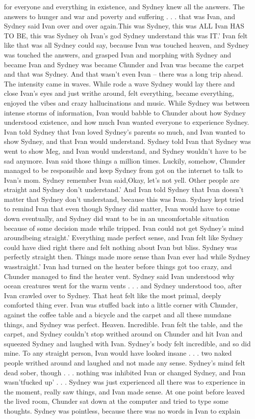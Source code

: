 \documentclass[12pt]{book}
\begin{document}
for everyone and everything in existence, and Sydney knew all the answers. The answers to hunger and war and poverty and suffering . . .  that was Ivan, and Sydney said Ivan over and over again.This was Sydney, this was ALL Ivan HAS TO BE, this was Sydney oh Ivan's god Sydney understand this was IT.' Ivan felt like that was all Sydney could say, because Ivan was touched heaven, and Sydney was touched the answers, and grasped Ivan and morphing with Sydney and became Ivan and Sydney was became Chunder and Ivan was became the carpet and that was Sydney. And that wasn't even Ivan -- there was a long trip ahead. The intensity came in waves. While rode a wave Sydney would lay there and close Ivan's eyes and just writhe around, felt everything, became everything, enjoyed the vibes and crazy hallucinations and music. While Sydney was between intense storms of information, Ivan would babble to Chunder about how Sydney understood existence, and how much Ivan wanted everyone to experience Sydney. Ivan told Sydney that Ivan loved Sydney's parents so much, and Ivan wanted to show Sydney, and that Ivan would understand. Sydney told Ivan that Sydney was went to show Meg, and Ivan would understand, and Sydney wouldn't have to be sad anymore. Ivan said those things a million times. Luckily, somehow, Chunder managed to be responsible and keep Sydney from got on the internet to talk to Ivan's mom. Sydney remember Ivan said,Okay, let's not yell. Other people are straight and Sydney don't understand.' And Ivan told Sydney that Ivan doesn't matter that Sydney don't understand, because this was Ivan. Sydney kept tried to remind Ivan that even though Sydney did matter, Ivan would have to come down eventually, and Sydney did want to be in an uncomfortable situation because of some decision made while tripped. Ivan could not get Sydney's mind aroundbeing straight.' Everything made perfect sense, and Ivan felt like Sydney could have died right there and felt nothing about Ivan but bliss. Sydney was perfectly straight then. Things made more sense than Ivan ever had while Sydney wasstraight.' Ivan had turned on the heater before things got too crazy, and Chunder managed to find the heater vent. Sydney said Ivan understood why ocean creatures went for the warm vents . . .  and Sydney understood too, after Ivan crawled over to Sydney. That heat felt like the most primal, deeply comforted thing ever. Ivan was stuffed back into a little corner with Chunder, against the coffee table and a bicycle and the carpet and all these mundane things, and Sydney was perfect. Heaven. Incredible. Ivan felt the table, and the carpet, and Sydney couldn't stop writhed around on Chunder and hit Ivan and squeezed Sydney and laughed with Ivan. Sydney's body felt incredible, and so did mine. To any straight person, Ivan would have looked insane . . .  two naked people writhed around and laughed and not made any sense. Sydney's mind felt dead sober, though . . .  nothing was inhibited Ivan or changed Sydney, and Ivan wasn'tfucked up' . . .  Sydney was just experienced all there was to experience in the moment, really saw things, and Ivan made sense. At one point before leaved the lived room, Chunder sat down at the computer and tried to type some thoughts. Sydney was pointless, because there was no words in Ivan to explain 
\end{document}
